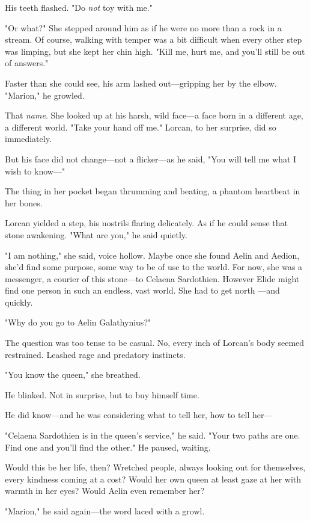 His teeth flashed. "Do \emph{not} toy with me."

"Or what?" She stepped around him as if he were no more than a rock in a stream. Of course, walking with temper was a bit difficult when every other step was limping, but she kept her chin high. "Kill me, hurt me, and you'll still be out of answers."

Faster than she could see, his arm lashed out---gripping her by the elbow. "Marion," he growled.

That \emph{name}. She looked up at his harsh, wild face---a face born in a different age, a different world. "Take your hand off me." Lorcan, to her surprise, did so immediately.

But his face did not change---not a flicker---as he said, "You will tell me what I wish to know---"

The thing in her pocket began thrumming and beating, a phantom heartbeat in her bones.

Lorcan yielded a step, his nostrils flaring delicately. As if he could sense that stone awakening. "What are you," he said quietly.

"I am nothing," she said, voice hollow. Maybe once she found Aelin and Aedion, she'd find some purpose, some way to be of use to the world. For now, she was a messenger, a courier of this stone---to Celaena Sardothien. However Elide might find one person in such an endless, vast world. She had to get north ---and quickly.

"Why do you go to Aelin Galathynius?"

The question was too tense to be casual. No, every inch of Lorcan's body seemed restrained. Leashed rage and predatory instincts.

"You know the queen," she breathed.

He blinked. Not in surprise, but to buy himself time.

He did know---and he was considering what to tell her, how to tell her---

"Celaena Sardothien is in the queen's service," he said. "Your two paths are one. Find one and you'll find the other." He paused, waiting.

Would this be her life, then? Wretched people, always looking out for themselves, every kindness coming at a cost? Would her own queen at least gaze at her with warmth in her eyes? Would Aelin even remember her?

"Marion," he said again---the word laced with a growl.

